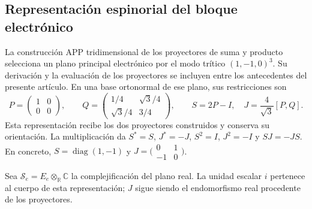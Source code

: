 \subsection{Representación espinorial del bloque electrónico}
\label{vi:vi:subsec:spin-electron}

La construcción APP tridimensional de los proyectores de suma y
producto selecciona un plano principal electrónico por el modo
trítico $(1,-1,0)^3$. Su derivación y la evaluación de los
proyectores se incluyen entre los antecedentes del presente
artículo. En una base ortonormal de ese plano, sus restricciones
son
\begin{equation}
 P=\begin{pmatrix}1&0\\0&0\end{pmatrix},\qquad
 Q=\begin{pmatrix}1/4&\sqrt3/4\\\sqrt3/4&3/4\end{pmatrix},
 \qquad S=2P-I,\quad J=\frac4{\sqrt3}[P,Q].
 \label{vi:vi:eq:bloque-electronico}
\end{equation}
Esta representación recibe los dos proyectores construidos y
conserva su orientación. La multiplicación da
$S^*=S$, $J^*=-J$, $S^2=I$, $J^2=-I$ y $SJ=-JS$.
En concreto, $S=\operatorname{diag}(1,-1)$ y
$J=\bigl(\begin{smallmatrix}0&1\\-1&0\end{smallmatrix}\bigr)$.

Sea $\mathscr S_e=E_e\otimes_{\mathbb R}\mathbb C$ la
complejificación del plano real. La unidad escalar $i$ pertenece
al cuerpo de esta representación; $J$ sigue siendo el
endomorfismo real procedente de los proyectores.

